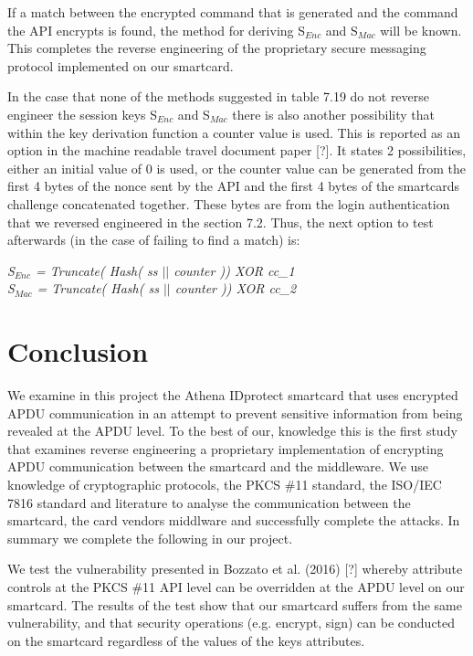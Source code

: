 \documentclass[bsc,frontabs,twoside,singlespacing,parskip,deptreport]{infthesis}     %
\begin{document}
If a match between the encrypted command that is generated and the command the API encrypts is found, the method for deriving S$_{Enc}$ and S$_{Mac}$ will be known. This completes the reverse engineering of the proprietary secure messaging protocol implemented on our smartcard. 

In the case that none of the methods suggested in table 7.19 do not reverse engineer the session keys S$_{Enc}$ and S$_{Mac}$ there is also another possibility that within the key derivation function a counter value is used. This is reported as an option in the machine readable travel document paper [?]. It states 2 possibilities, either an initial value of 0 is used, or the counter value can be generated from the first 4 bytes of the nonce sent by the API and the first 4 bytes of the smartcards challenge concatenated together. These bytes are from the login authentication that we reversed engineered in the section 7.2. Thus, the next option to test afterwards (in the case of failing to find a match) is:
\begin{center}
\textit{S$_{Enc}$ = Truncate( Hash( ss $||$ counter )) XOR cc\_1\\}
\textit{S$_{Mac}$ = Truncate( Hash( ss $||$ counter )) XOR cc\_2\\}
\end{center}

\chapter{Conclusion}

We examine in this project the Athena IDprotect smartcard that uses encrypted APDU communication in an attempt to prevent sensitive information from being revealed at the APDU level. To the best of our, knowledge this is the first study that examines reverse engineering a proprietary implementation of encrypting APDU communication between the smartcard and the middleware. We use knowledge of cryptographic protocols, the PKCS \#11 standard, the ISO/IEC 7816 standard and literature to analyse the communication between the smartcard, the card vendors middlware and successfully complete the attacks. In summary we complete the following in our project.

We test the vulnerability presented in Bozzato et al. (2016) [?] whereby attribute controls at the PKCS \#11 API level can be overridden at the APDU level on our smartcard. The results of the test show that our smartcard suffers from the same vulnerability, and that security operations (e.g. encrypt, sign) can be conducted on the smartcard regardless of the values of the keys attributes.
\end{document}
